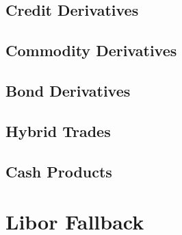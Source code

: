 \documentclass[12pt, a4paper]{article}
\begin{document}
\subsection{Credit Derivatives}







\subsection{Commodity Derivatives}









%
%

\subsection{Bond Derivatives}




\subsection{Hybrid Trades}



\subsection{Cash Products}











\section{Libor Fallback}




\newpage

\end{document}
